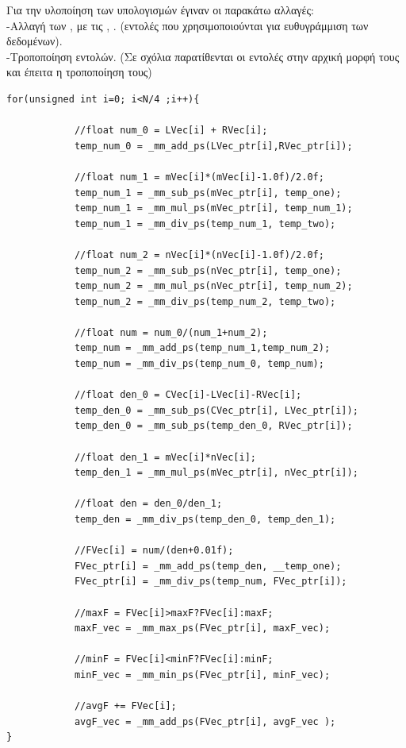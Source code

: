 \documentclass{article}
\begin{document}
Για την υλοποίηση των υπολογισμών έγιναν οι παρακάτω αλλαγές:\\
-Αλλαγή των ,  με τις \textunderscore \textunderscore {}\textunderscore {}, \textunderscore \textunderscore {}\textunderscore {}. 
(εντολές που χρησιμοποιούνται για ευθυγράμμιση των δεδομένων).\\
-Tροποποίηση εντολών.
(Σε σχόλια παρατίθενται οι εντολές στην αρχική μορφή τους και έπειτα η τροποποίηση τους)
\newline
{}
\begin{lstlisting}
for(unsigned int i=0; i<N/4 ;i++){

            //float num_0 = LVec[i] + RVec[i];
            temp_num_0 = _mm_add_ps(LVec_ptr[i],RVec_ptr[i]);

            //float num_1 = mVec[i]*(mVec[i]-1.0f)/2.0f;
            temp_num_1 = _mm_sub_ps(mVec_ptr[i], temp_one);
            temp_num_1 = _mm_mul_ps(mVec_ptr[i], temp_num_1);
            temp_num_1 = _mm_div_ps(temp_num_1, temp_two);

            //float num_2 = nVec[i]*(nVec[i]-1.0f)/2.0f;
            temp_num_2 = _mm_sub_ps(nVec_ptr[i], temp_one);
            temp_num_2 = _mm_mul_ps(nVec_ptr[i], temp_num_2);
            temp_num_2 = _mm_div_ps(temp_num_2, temp_two);

            //float num = num_0/(num_1+num_2);
            temp_num = _mm_add_ps(temp_num_1,temp_num_2);
            temp_num = _mm_div_ps(temp_num_0, temp_num);

            //float den_0 = CVec[i]-LVec[i]-RVec[i];
            temp_den_0 = _mm_sub_ps(CVec_ptr[i], LVec_ptr[i]);
            temp_den_0 = _mm_sub_ps(temp_den_0, RVec_ptr[i]);

            //float den_1 = mVec[i]*nVec[i];
            temp_den_1 = _mm_mul_ps(mVec_ptr[i], nVec_ptr[i]);

            //float den = den_0/den_1;
            temp_den = _mm_div_ps(temp_den_0, temp_den_1);

            //FVec[i] = num/(den+0.01f);
            FVec_ptr[i] = _mm_add_ps(temp_den, __temp_one);
            FVec_ptr[i] = _mm_div_ps(temp_num, FVec_ptr[i]);

            //maxF = FVec[i]>maxF?FVec[i]:maxF;
            maxF_vec = _mm_max_ps(FVec_ptr[i], maxF_vec);

            //minF = FVec[i]<minF?FVec[i]:minF;
            minF_vec = _mm_min_ps(FVec_ptr[i], minF_vec);

            //avgF += FVec[i];
            avgF_vec = _mm_add_ps(FVec_ptr[i], avgF_vec );
}
\end{lstlisting}
\end{document}
